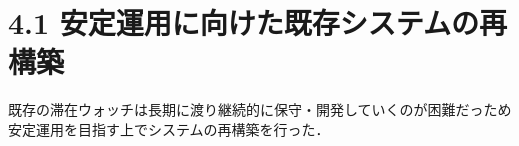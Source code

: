 






\section*{4.1 安定運用に向けた既存システムの再構築}

既存の滞在ウォッチは長期に渡り継続的に保守・開発していくのが困難だっため安定運用を目指す上でシステムの再構築を行った．


